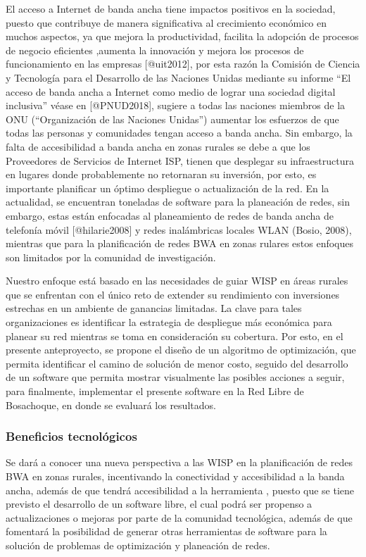 \documentclass[]{article}
\begin{document}
El acceso a Internet de banda ancha tiene impactos positivos en la
sociedad, puesto que contribuye de manera significativa al crecimiento
económico en muchos aspectos, ya que mejora la productividad, facilita
la adopción de procesos de negocio eficientes ,aumenta la innovación y
mejora los procesos de funcionamiento en las empresas {[}@uit2012{]},
por esta razón la Comisión de Ciencia y Tecnología para el Desarrollo de
las Naciones Unidas mediante su informe ``El acceso de banda ancha a
Internet como medio de lograr una sociedad digital inclusiva'' véase en
{[}@PNUD2018{]}, sugiere a todas las naciones miembros de la ONU
(``Organización de las Naciones Unidas'') aumentar los esfuerzos de que
todas las personas y comunidades tengan acceso a banda ancha. Sin
embargo, la falta de accesibilidad a banda ancha en zonas rurales se
debe a que los Proveedores de Servicios de Internet ISP, tienen que
desplegar su infraestructura en lugares donde probablemente no
retornaran su inversión, por esto, es importante planificar un óptimo
despliegue o actualización de la red. En la actualidad, se encuentran
toneladas de software para la planeación de redes, sin embargo, estas
están enfocadas al planeamiento de redes de banda ancha de telefonía
móvil {[}@hilarie2008{]} y redes inalámbricas locales WLAN (Bosio,
2008), mientras que para la planificación de redes BWA en zonas rulares
estos enfoques son limitados por la comunidad de investigación.

Nuestro enfoque está basado en las necesidades de guiar WISP en áreas
rurales que se enfrentan con el único reto de extender su rendimiento
con inversiones estrechas en un ambiente de ganancias limitadas. La
clave para tales organizaciones es identificar la estrategia de
despliegue más económica para planear su red mientras se toma en
consideración su cobertura. Por esto, en el presente anteproyecto, se
propone el diseño de un algoritmo de optimización, que permita
identificar el camino de solución de menor costo, seguido del desarrollo
de un software que permita mostrar visualmente las posibles acciones a
seguir, para finalmente, implementar el presente software en la Red
Libre de Bosachoque, en donde se evaluará los resultados.

\subsubsection{Beneficios
tecnológicos}\label{beneficios-tecnoluxf3gicos}

Se dará a conocer una nueva perspectiva a las WISP en la planificación
de redes BWA en zonas rurales, incentivando la conectividad y
accesibilidad a la banda ancha, además de que tendrá accesibilidad a la
herramienta , puesto que se tiene previsto el desarrollo de un software
libre, el cual podrá ser propenso a actualizaciones o mejoras por parte
de la comunidad tecnológica, además de que fomentará la posibilidad de
generar otras herramientas de software para la solución de problemas de
optimización y planeación de redes.
\end{document}

